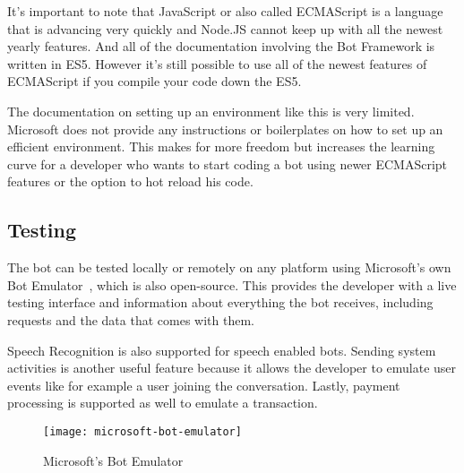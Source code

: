 It's important to note that JavaScript or also called ECMAScript is a language that is advancing very quickly and Node.JS cannot keep up with all the newest yearly features. And all of the documentation involving the Bot Framework is written in ES5. However it's still possible to use all of the newest features of ECMAScript if you compile your code down the ES5.

The documentation on setting up an environment like this is very limited. Microsoft does not provide any instructions or boilerplates on how to set up an efficient environment. This makes for more freedom but increases the learning curve for a developer who wants to start coding a bot using newer ECMAScript features or the option to hot reload his code.

\subsection{Testing}

The bot can be tested locally or remotely on any platform using Microsoft's own Bot Emulator~\cite{microsoft-bot-emulator}, which is also open-source. This provides the developer with a live testing interface and information about everything the bot receives, including requests and the data that comes with them.

Speech Recognition is also supported for speech enabled bots. Sending system activities is another useful feature because it allows the developer to emulate user events like for example a user joining the conversation. Lastly, payment processing is supported as well to emulate a transaction.

\begin{figure}[ht]
	\centering
	\texttt{[image: microsoft-bot-emulator]}\label{fig:microsoft-azure-calculator-screen}
	\caption{Microsoft's Bot Emulator~\cite{microsoft-bot-emulator}}
\end{figure}